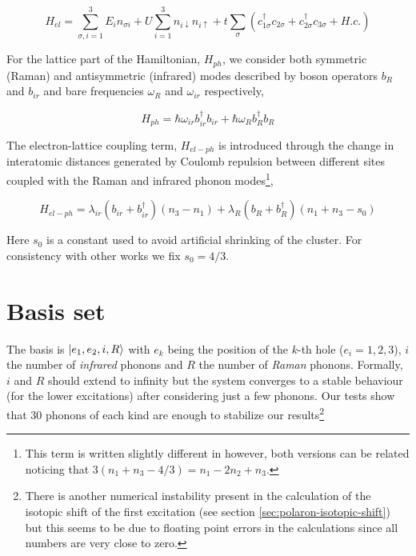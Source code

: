 \begin{equation}\label{eq:electronic-part}
H_{el} = \sum_{\sigma,i=1}^3 E_i n_{\sigma i} + U\sum_{i=1}^3 n_{i\downarrow}n_{i\uparrow} + t\sum_{\sigma}(c_{1\sigma}^\dagger c_{2\sigma} + c_{2\sigma}^\dagger c_{3\sigma} + H.c.)
\end{equation}

For the lattice  part of the Hamiltonian, $H_{ph}$, we consider both symmetric (Raman) and antisymmetric (infrared) modes described by boson operators $b_R$ and $b_{ir}$ and bare frequencies $\omega_R$ and $\omega_{ir}$ respectively,
 
\begin{equation}\label{eq:phonon-part}
H_{ph} = \hbar \omega_{ir}b_{ir}^\dagger b_{ir} + \hbar \omega_R b_R^\dagger b_R
\end{equation}

 
The electron-lattice coupling term, $H_{el-ph}$ is introduced through the change in interatomic distances generated by Coulomb repulsion between different sites coupled with the Raman and infrared phonon modes\footnote{This term is written slightly different in \cite{MustredeLeon1992} however, both versions can be related noticing that $3 (n_1+n_3-4/3)=n_1-2n_2+n_3$.},
 
\begin{equation}\label{eq:coupling-part}
H_{el-ph} = \lambda_{ir}(b_{ir} + b_{ir}^\dagger)(n_3 - n_1) + \lambda_R (b_R + b_R^\dagger)(n_1 + n_3-s_0)
\end{equation}

Here $s_0$ is a constant used to avoid artificial shrinking of the cluster. 
For consistency with other works \cite{MustredeLeon1992,DeLeon1999,Leon2008,MirandaMena2007} we fix $s_0=4/3$.


\section{Basis set}
\label{sec:basis-set}

The basis is $\left | e_1,e_2,i,R \right\rangle$ with $e_k$ being the position of the $k$-th hole ($e_i=1,2,3$), $i$ the number of \textit{infrared} phonons and $R$ the number of \textit{Raman} phonons. 
Formally, $i$ and $R$ should extend to infinity but the system converges to a stable behaviour (for the lower excitations) after considering just a few phonons. 
Our tests show that 30 phonons of each kind are enough to stabilize our results\footnote{There is another numerical instability present in the calculation of the isotopic shift of the first excitation (see section \ref{sec:polaron-isotopic-shift}) but this seems to be due to floating point errors in the calculations since all numbers are very close to zero.}

